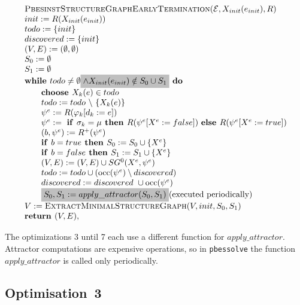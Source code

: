 \documentclass{article}
\newcommand{\Space}{\text{\ }}
\newcommand{\If}{\text{\textbf{if }}}
\newcommand{\Do}{\text{\textbf{ do }}}
\newcommand{\Then}{\text{\textbf{ then }}}
\newcommand{\Else}{\text{\textbf{else }}}
\newcommand{\While}{\text{\textbf{while }}}
\newcommand{\Choose}{\text{\textbf{choose }}}
\newcommand{\Return}{\text{\textbf{return }}}
\begin{document}
\begin{equation*}
\begin{array}{l}
\textsc{PbesinstStructureGraphEarlyTermination}(\mathcal{E}, X_{init}(e_{init}), R) \\ 
init:=R(X_{init}(e_{init})) \\
todo:=\{init\} \\
discovered:=\{init\} \\
(V,E) :=(\emptyset ,\emptyset ) \\ 
S_0:= \emptyset \\
S_1:= \emptyset \\
\While todo\neq \emptyset
\colorbox{lightgray}{$\wedge X_{init}(e_{init}) \notin S_0 \cup S_1 $}
\Do \\ 
\qquad \Choose X_{k}(e)\in todo \\ 
\qquad todo:=todo\ \backslash \ \{X_{k}(e)\} \\ 
\qquad \psi ^{e}:=R(\varphi _{k}[d_{k}:=e]) \\ 
\qquad \psi^e := \Space \If \sigma_k = \mu \Then R(\psi^e[X^e := false])
\Space \Else R(\psi^e[X^e := true]) \\
\qquad (b,\psi^e) := R^+(\psi^e) \\
\qquad \If b = true \Then S_0 := S_0 \cup \{ X^e \}\\
\qquad \If b = false \Then S_1 := S_1 \cup \{ X^e \}\\
\qquad (V,E) := (V,E) \cup SG^{0}(X^{e},\psi ^{e}) \\ 
\qquad todo:=todo\cup (\mathrm{occ}(\psi ^{e})\setminus discovered) \\
\qquad discovered:=discovered\ \cup \mathrm{occ}(\psi ^{e}) \\
\qquad \colorbox{lightgray}{$S_0, S_1 := apply\_attractor(S_0, S_1)$} 
\text{(executed periodically)} \\
V := \textsc{ExtractMinimalStructureGraph}(V, init, S_0, S_1) \\
\Return(V, E),
\end{array}
\end{equation*}

The optimizations 3 until 7 each use a different function for $apply\_attractor$. Attractor
computations are expensive operations, so in \texttt{pbessolve} the function $apply\_attractor$
is called only periodically.

\subsection{Optimisation~3}
\end{document}
